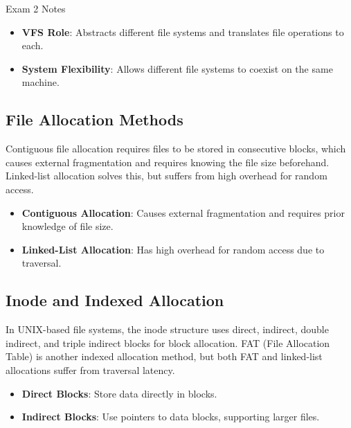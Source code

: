 \begin{examnotes}{Exam 2 Notes}
    \begin{highlight}
        \begin{itemize}
            \item \textbf{VFS Role}: Abstracts different file systems and translates file operations to each.
            \item \textbf{System Flexibility}: Allows different file systems to coexist on the same machine.
        \end{itemize}
    \end{highlight}
    
    \subsection*{File Allocation Methods}
    
    Contiguous file allocation requires files to be stored in consecutive blocks, which causes external fragmentation and requires knowing the file size beforehand. Linked-list allocation solves this, but 
    suffers from high overhead for random access.
    
    \begin{highlight}
        \begin{itemize}
            \item \textbf{Contiguous Allocation}: Causes external fragmentation and requires prior knowledge of file size.
            \item \textbf{Linked-List Allocation}: Has high overhead for random access due to traversal.
        \end{itemize}
    \end{highlight}
    
    \subsection*{Inode and Indexed Allocation}
    
    In UNIX-based file systems, the inode structure uses direct, indirect, double indirect, and triple indirect blocks for block allocation. FAT (File Allocation Table) is another indexed allocation method, 
    but both FAT and linked-list allocations suffer from traversal latency.
    
    \begin{highlight}
        \begin{itemize}
            \item \textbf{Direct Blocks}: Store data directly in blocks.
            \item \textbf{Indirect Blocks}: Use pointers to data blocks, supporting larger files.
        \end{itemize}
    \end{highlight}
    

\end{examnotes}
